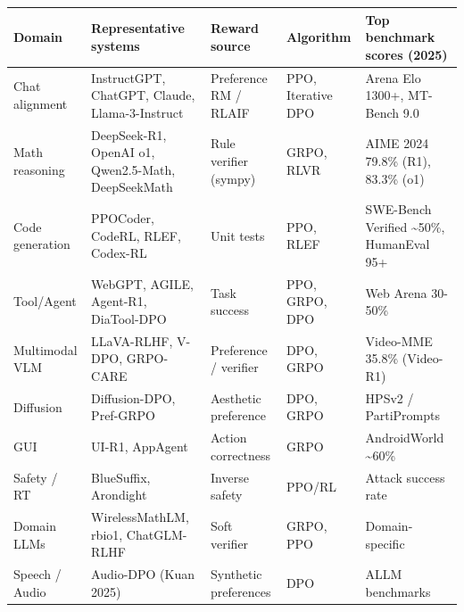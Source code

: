{\def\LTcaptype{none} %
\begin{longtable}[]{@{}
  >{\raggedright\arraybackslash}p{}
  >{\raggedright\arraybackslash}p{}
  >{\raggedright\arraybackslash}p{}
  >{\raggedright\arraybackslash}p{}
  >{\raggedright\arraybackslash}p{}@{}}
\toprule\noalign{}
\begin{minipage}[b]{\linewidth}\raggedright
Domain
\end{minipage} & \begin{minipage}[b]{\linewidth}\raggedright
Representative systems
\end{minipage} & \begin{minipage}[b]{\linewidth}\raggedright
Reward source
\end{minipage} & \begin{minipage}[b]{\linewidth}\raggedright
Algorithm
\end{minipage} & \begin{minipage}[b]{\linewidth}\raggedright
Top benchmark scores (2025)
\end{minipage} \\
\midrule\noalign{}
\endhead
\bottomrule\noalign{}
\endlastfoot
Chat alignment & InstructGPT, ChatGPT, Claude, Llama-3-Instruct & Preference RM / RLAIF & PPO, Iterative DPO & Arena Elo 1300+, MT-Bench 9.0 \\
Math reasoning & DeepSeek-R1, OpenAI o1, Qwen2.5-Math, DeepSeekMath & Rule verifier (sympy) & GRPO, RLVR & AIME 2024 79.8\% (R1), 83.3\% (o1) \\
Code generation & PPOCoder, CodeRL, RLEF, Codex-RL & Unit tests & PPO, RLEF & SWE-Bench Verified \textasciitilde50\%, HumanEval 95+ \\
Tool/Agent & WebGPT, AGILE, Agent-R1, DiaTool-DPO & Task success & PPO, GRPO, DPO & Web Arena 30-50\% \\
Multimodal VLM & LLaVA-RLHF, V-DPO, GRPO-CARE & Preference / verifier & DPO, GRPO & Video-MME 35.8\% (Video-R1) \\
Diffusion & Diffusion-DPO, Pref-GRPO & Aesthetic preference & DPO, GRPO & HPSv2 / PartiPrompts \\
GUI & UI-R1, AppAgent & Action correctness & GRPO & AndroidWorld \textasciitilde60\% \\
Safety / RT & BlueSuffix, Arondight & Inverse safety & PPO/RL & Attack success rate \\
Domain LLMs & WirelessMathLM, rbio1, ChatGLM-RLHF & Soft verifier & GRPO, PPO & Domain-specific \\
Speech / Audio & Audio-DPO (Kuan 2025) & Synthetic preferences & DPO & ALLM benchmarks \\
\end{longtable}
}

